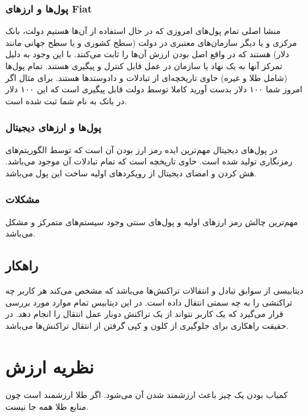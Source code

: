 \documentclass[10pt, a4paper]{article}
\begin{document}
\subsubsection{پول‌ها و ارز‌های Fiat}

منشا اصلی تمام پول‌های امروزی که در حال استفاده از آن‌ها هستیم دولت، بانک مرکزی
و یا دیگر سازمان‌های معتبری در دولت (سطح کشوری و یا سطح جهانی مانند دلار) هستند
که در واقع اصل بودن ارزش آن‌ها را ثابت می‌کنند. با این وجود به دلیل تمرکز آنها
به یک نهاد یا سازمان در عمل قابل کنترل و پیگیری هستند. تمام پول‌ها (شامل طلا و
غیره) حاوی تاریخچه‌ای از تبادلات و دادوستد‌ها هستند. برای مثال اگر امروز شما ۱۰۰
دلار بدست آورید کاملا توسط دولت قابل پیگیری است که این ۱۰۰ دلار در بانک به نام
شما ثبت شده است.

\subsubsection{پول‌ها و ارز‌های دیجیتال}

در پول‌های دیجیتال مهم‌ترین ایده رمز ارز بودن آن است که توسط الگوریتم‌های
رمزنگاری تولید شده است. حاوی تاریخچه است که تمام تبادلات آن موجود می‌باشد. هش
کردن و امضای دیجیتال از رویکرد‌های اولیه ساخت این پول می‌باشد.

\subsubsection{مشکلات}

مهم‌ترین چالش رمز ارز‌های اولیه و پول‌های سنتی وجود سیستم‌های متمرکز و مشکل
 می‌باشد.

\subsection{راهکار }

دیتابیسی از سوابق تبادل و انتقالات تراکنش‌ها می‌باشد که مشخص می‌کند هر کاربر چه
تراکنشی را به چه سمتی انتقال داده است. در این دیتابیس تمام موارد  مورد بررسی قرار می‌گیرد که یک کاربر نتواند از یک تراکنش دوبار عمل انتقال
را انجام دهد. در حقیقت راهکاری برای جلوگیری از کلون و کپی گرفتن از انتقال
تراکنش‌ها می‌باشد.

\section{نظریه ارزش}

کمیاب بودن یک چیز باعث ارزشمند شدن آن می‌شود. اگر طلا ارزشمند است چون منابع طلا
همه جا نیست.
\end{document}
